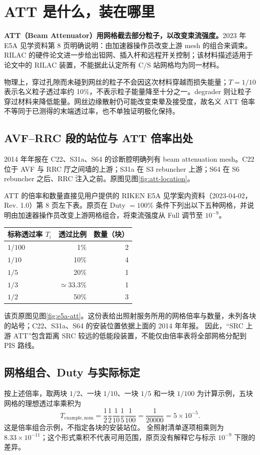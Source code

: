 \documentclass[UTF8,11pt,a4paper]{ctexart}
\begin{document}
\section{ATT 是什么，装在哪里}
\label{sec:att}

\textbf{ATT（Beam Attenuator）用网格截去部分粒子，以改变束流强度。}2023 年 E5A 见学资料第 8 页明确说明：由加速器操作员改变上游 mesh 的组合来调束。\cite{e5a} RILAC 的硬件论文进一步给出钽网、插入杆和远程开关控制；该材料描述适用于论文中的 RILAC 装置，不能据此认定所有 C/S 站网格均为同一材料。\cite{att-hardware}

物理上，穿过孔隙而未碰到网丝的粒子不会因这次材料穿越而损失能量；$T=1/10$ 表示名义粒子透过率约 10\%，不表示粒子能量降至十分之一。degrader 则让粒子穿过材料来降低能量。网丝边缘散射仍可能改变束晕及接受度，故名义 ATT 倍率不等同于已测得的末端透过率，也不单独证明极化保持。

\subsection{AVF--RRC 段的站位与 ATT 倍率出处}
2014 年年报在 C22、S31a、S64 的诊断腔明确列有 beam attenuation mesh。C22 位于 AVF 与 RRC 厅之间墙的上游；S31a 在 S3 rebuncher 上游；S64 在 S6 rebuncher 之后、RRC 注入之前。原图见图\ref{fig:att-location}。\cite{att-chambers}

ATT 的倍率和数量直接见用户提供的 RIKEN E5A 见学案内资料（2023-04-02，Rev. 1.0）第 8 页左下表。原页在 Duty $=100\%$ 条件下列出以下五种网格，并说明由加速器操作员改变上游网格组合，将束流强度从 Full 调节至 $10^{-9}$。\cite{e5a}
\begin{center}
\begin{tabular}{lrr}
\toprule
标称透过率 $T_i$ & 透过比例 & 数量（块） \\
\midrule
$1/100$ & 1\% & 2 \\
$1/10$ & 10\% & 4 \\
$1/5$ & 20\% & 1 \\
$1/3$ & $\simeq33.3\%$ & 1 \\
$1/2$ & 50\% & 3 \\
\bottomrule
\end{tabular}
\end{center}
该页原图见图\ref{fig:e5a-att}。这份表给出照射服务所用的网格倍率与数量，未列各块的站号；C22、S31a、S64 的安装位置依据上面的 2014 年年报。\cite{att-chambers} 因此，“SRC 上游 ATT”包含距离 SRC 较远的低能段装置，不能仅由倍率表将全部网格分配到 PIS 路线。

\subsection{网格组合、Duty 与实际标定}
按上述倍率，取两块 $1/2$、一块 $1/10$、一块 $1/5$ 和一块 $1/100$ 为计算示例，五块网格的理想透过率乘积为
\[
T_{\mathrm{example,nom}}=\frac12\frac12\frac1{10}\frac15\frac1{100}
=\frac1{20000}=5\times10^{-5}.
\]
这是倍率组合示例，不指定各块的安装站位。
全照射清单逐项相乘则为 $8.33\times10^{-11}$；这个形式乘积不代表可用范围，原页没有解释它与标示 $10^{-9}$ 下限的差异。
\end{document}
